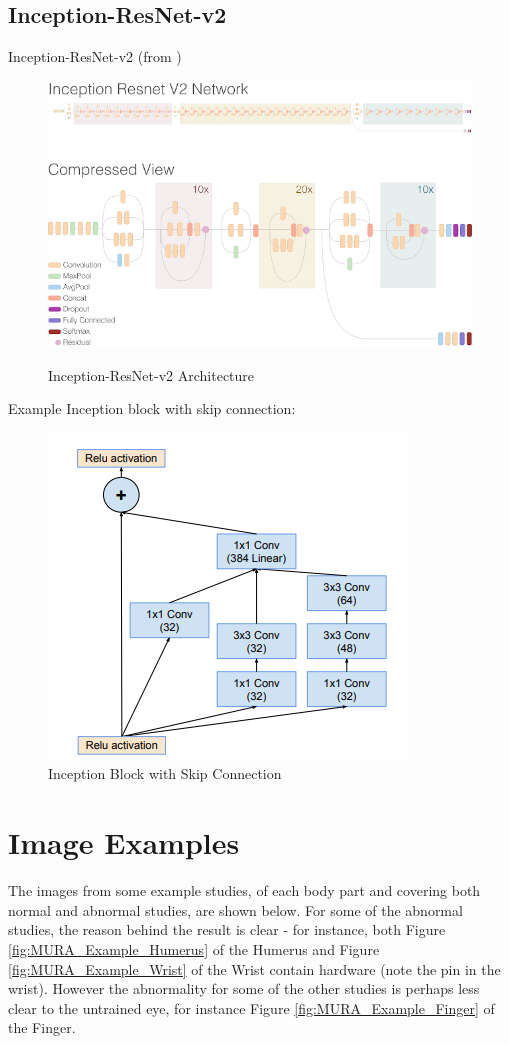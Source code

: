 \documentclass[11pt]{article} %
\theoremstyle{plain}
\theoremstyle{definition}
\begin{document}
\subsection{Inception-ResNet-v2}
Inception-ResNet-v2 (from \cite{IRNV2_Webpage})
\begin{figure}[!ht]
\centering
\includegraphics[scale=0.5]{IRNV2.png}
\label{fig:IRNV2}
\caption{Inception-ResNet-v2 Architecture}
\end{figure}
Example Inception block with skip connection:
\begin{figure}[!ht]
    \centering    
    \caption{Inception Block with Skip Connection}
    \label{fig:InceptionResNet}
    \includegraphics[scale=0.7]{InceptionResNet.PNG}
\end{figure}

\section{Image Examples} \label{Image-Examples}
The images from some example studies, of each body part and covering both normal and abnormal studies, are shown below. For some of the abnormal studies, the reason behind the result is clear - for instance, both Figure \ref{fig:MURA_Example_Humerus} of the Humerus and Figure \ref{fig:MURA_Example_Wrist} of the Wrist contain hardware (note the pin in the wrist). However the abnormality for some of the other studies is perhaps less clear to the untrained eye, for instance Figure \ref{fig:MURA_Example_Finger} of the Finger.
\end{document}
